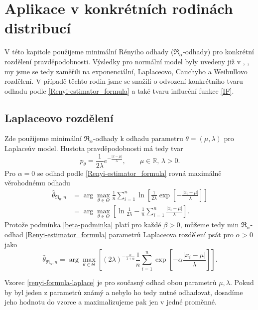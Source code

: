 
\chapter{Aplikace v konkrétních rodinách distribucí}

V této kapitole použijeme minimální Rényiho odhady ($\mathfrak{R}_\alpha$-odhady) pro konkrétní rozdělení pravděpodobnosti. Výsledky pro normální model byly uvedeny již v \cite{Vajda2009}, \cite{Demut2010}, my jsme se tedy zaměřili na exponenciální, Laplaceovo, Cauchyho a Weibullovo rozdělení. V případě těchto rodin jsme se snažili o odvození konkrétního tvaru odhadu podle \eqref{Renyi-estimator_formula} a také tvaru influeční funkce \eqref{IF}.

\section{Laplaceovo rozdělení} %

Zde použijeme minimální $\mathfrak{R}_\alpha$-odhady k odhadu parametru $\theta = (\mu,\lambda)$ pro Laplaceův model. Hustota pravděpodobnosti má tedy tvar
\begin{equation}
	p_\theta = \frac{1}{2\lambda} e^{-\frac{|x-\mu|}{\lambda}}, \qquad \mu\in \mathbb{R},\, \lambda>0.
\end{equation}
Pro $\alpha = 0$ se odhad podle \eqref{Renyi-estimator_formula} rovná maximálně věrohodnému odhadu
\begin{align}
	\hat{\theta}_{\mathfrak{R}_0,n} & = \arg \max_{\theta \in \Theta} \frac{1}{n} \sum^n_{i=1} \ln \left[ \frac{1}{2\lambda}\exp \left[-\frac{|x_i-\mu|}{\lambda} \right] \right] \nonumber \\
	& =  \arg \max_{\theta \in \Theta} \left[ \ln \frac{1}{2\lambda} - \frac{1}{n} \sum^n_{i=1} \frac{|x_i-\mu|}{\lambda} \right].
\end{align}
Protože podmínka \eqref{beta-podminka} platí pro každé $\beta>0$, můžeme tedy min $\mathfrak{R}_\alpha$-odhad \eqref{Renyi-estimator_formula} parametrů Laplaceova rozdělení psát pro $\alpha>0$ jako 
\begin{equation}
	\hat{\theta}_{\mathfrak{R}_\alpha,n} = \arg \max_{\theta \in \Theta} \left[ (2\lambda)^{-\frac{\alpha}{1+\alpha}} \frac{1}{n} \sum_{i=1}^n \exp \left[-\alpha\frac{|x_i-\mu|}{\lambda} \right] \right].
	\label{renyi-formula-laplace}
\end{equation}

\noindent Vzorec \eqref{renyi-formula-laplace} je pro současný odhad obou parametrů $\mu, \lambda$. Pokud by byl jeden z parametrů známý a nebylo ho tedy nutné odhadovat, dosadíme jeho hodnotu do vzorce a maximalizujeme pak jen v jedné proměnné. 


